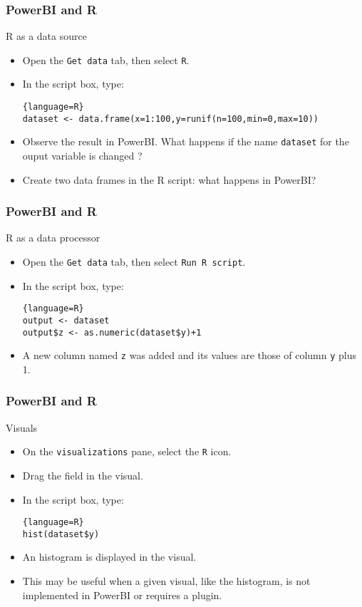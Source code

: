 \begin{frame}[fragile]
    \frametitle{PowerBI and R}
\begin{block}{R as a data source}
    \begin{itemize}
        \item<+-> Open the \texttt{Get data} tab, then select \texttt{R}.
        \item<+-> In the script box, type:
        \begin{lstlisting}{language=R}
dataset <- data.frame(x=1:100,y=runif(n=100,min=0,max=10))
        \end{lstlisting}
        \item<+-> Observe the result in PowerBI. What happens if the name \texttt{dataset} for the ouput variable is changed ?
        \item<+-> Create two data frames in the R script: what happens in PowerBI?
    \end{itemize}
\end{block}
\end{frame}
\begin{frame}[fragile]
    \frametitle{PowerBI and R}
\begin{block}{R as a data processor}
    \begin{itemize}
        \item<+-> Open the \texttt{Get data} tab, then select \texttt{Run R script}.
        \item<+-> In the script box, type:
        \begin{lstlisting}{language=R}
output <- dataset
output$z <- as.numeric(dataset$y)+1
        \end{lstlisting}
        \item<+-> A new column named \texttt{z} was added and its values are those of column \texttt{y} plus 1.
    \end{itemize}
\end{block}
\end{frame}
\begin{frame}[fragile]
    \frametitle{PowerBI and R}
\begin{block}{Visuals}
    \begin{itemize}
        \item<+-> On the \texttt{visualizations} pane, select the \texttt{R} icon.
        \item<+-> Drag the  field in the visual.
        \item<+-> In the script box, type:
        \begin{lstlisting}{language=R}
hist(dataset$y)
        \end{lstlisting}
        \item<+-> An histogram is displayed in the visual. 
        \item<+-> This may be useful when a given visual, like the histogram, is not implemented in PowerBI or requires a plugin.
    \end{itemize}
\end{block}
\end{frame}
    
